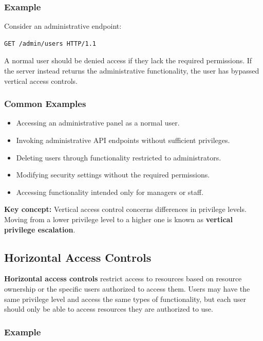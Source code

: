 \documentclass[11pt,a4paper]{article}
\begin{document}
\subsubsection{Example}

Consider an administrative endpoint:
\begin{lstlisting}[language=HTTP]
GET /admin/users HTTP/1.1
\end{lstlisting}

A normal user should be denied access if they lack the required permissions. If the server instead returns the administrative functionality, the user has bypassed vertical access controls.

\subsubsection{Common Examples}

\begin{itemize}
    \item Accessing an administrative panel as a normal user.
    \item Invoking administrative API endpoints without sufficient privileges.
    \item Deleting users through functionality restricted to administrators.
    \item Modifying security settings without the required permissions.
    \item Accessing functionality intended only for managers or staff.
\end{itemize}

\textbf{Key concept:} Vertical access control concerns differences in privilege levels. Moving from a lower privilege level to a higher one is known as \textbf{vertical privilege escalation}.

\subsection{Horizontal Access Controls}

\textbf{Horizontal access controls} restrict access to resources based on resource ownership or the specific users authorized to access them.
Users may have the same privilege level and access the same types of functionality, but each user should only be able to access resources they are authorized to use.

\subsubsection{Example}
\end{document}
